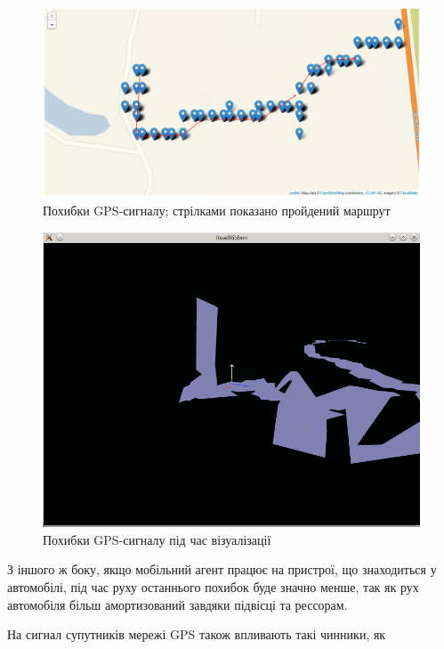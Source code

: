 \documentclass[simple,a4paper,14pt,ukrainian,utf8]{eskdtext}
\begin{document}
	\vspace{2em}
	\begin{figure}
		\centering \includegraphics[scale=0.35]{images/errors1.png}
		\caption{Похибки GPS-сигналу; стрілками показано пройдений маршрут}
	\end{figure}

	\vspace{2em}
	\begin{figure}
		\centering \includegraphics[scale=0.5]{images/errors2.png}
		\caption{Похибки GPS-сигналу під час візуалізації}
	\end{figure}
	
	З іншого ж боку, якщо мобільний агент працює на пристрої, що знаходиться у автомобілі, під час руху останнього похибок буде значно менше, так як рух автомобіля більш амортизований завдяки підвісці та рессорам.
	
	На сигнал супутників мережі GPS також впливають такі чинники, як
	
\end{document}
